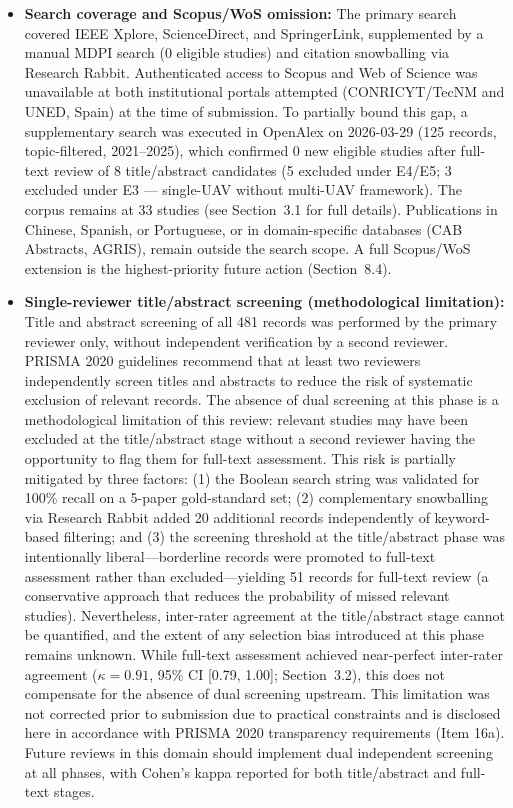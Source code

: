 \documentclass[review,3p,times]{elsarticle}
\begin{document}
\begin{itemize}
  \item \textbf{Search coverage and Scopus/WoS omission:} The primary search covered IEEE Xplore, ScienceDirect, and SpringerLink, supplemented by a manual MDPI search (0 eligible studies) and citation snowballing via Research Rabbit. Authenticated access to Scopus and Web of Science was unavailable at both institutional portals attempted (CONRICYT/TecNM and UNED, Spain) at the time of submission. To partially bound this gap, a supplementary search was executed in OpenAlex on 2026-03-29 (125 records, topic-filtered, 2021--2025), which confirmed 0 new eligible studies after full-text review of 8 title/abstract candidates (5 excluded under E4/E5; 3 excluded under E3 — single-UAV without multi-UAV framework). The corpus remains at 33 studies (see Section~3.1 for full details). Publications in Chinese, Spanish, or Portuguese, or in domain-specific databases (CAB Abstracts, AGRIS), remain outside the search scope. A full Scopus/WoS extension is the highest-priority future action (Section~8.4).
  \item \textbf{Single-reviewer title/abstract screening (methodological limitation):} Title and abstract screening of all 481 records was performed by the primary reviewer only, without independent verification by a second reviewer. PRISMA 2020 guidelines \cite{page2021} recommend that at least two reviewers independently screen titles and abstracts to reduce the risk of systematic exclusion of relevant records. The absence of dual screening at this phase is a methodological limitation of this review: relevant studies may have been excluded at the title/abstract stage without a second reviewer having the opportunity to flag them for full-text assessment. This risk is partially mitigated by three factors: (1) the Boolean search string was validated for 100\% recall on a 5-paper gold-standard set; (2) complementary snowballing via Research Rabbit added 20 additional records independently of keyword-based filtering; and (3) the screening threshold at the title/abstract phase was intentionally liberal---borderline records were promoted to full-text assessment rather than excluded---yielding 51 records for full-text review (a conservative approach that reduces the probability of missed relevant studies). Nevertheless, inter-rater agreement at the title/abstract stage cannot be quantified, and the extent of any selection bias introduced at this phase remains unknown. While full-text assessment achieved near-perfect inter-rater agreement ($\kappa=0.91$, 95\% CI [0.79, 1.00]; Section~3.2), this does not compensate for the absence of dual screening upstream. This limitation was not corrected prior to submission due to practical constraints and is disclosed here in accordance with PRISMA 2020 transparency requirements (Item 16a). Future reviews in this domain should implement dual independent screening at all phases, with Cohen's kappa reported for both title/abstract and full-text stages.

\end{itemize}
\end{document}
